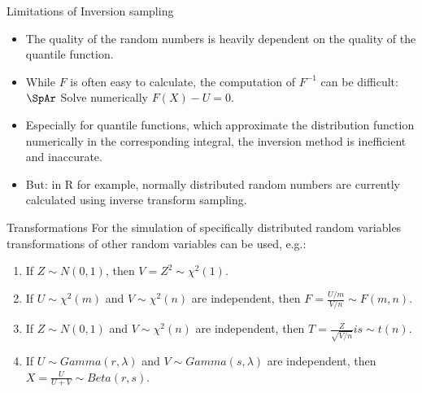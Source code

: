 \begin{vbframe}{Limitations of Inversion sampling}
\begin{itemize}
  \item The quality of the random numbers is heavily dependent on the quality of the quantile function.
  \item While $F$ is often easy to calculate, the computation of $F^{-1}$ can be difficult:
\\ $\SpAr$ Solve numerically $F(X) - U = 0$.
  \item Especially for quantile functions, which approximate the distribution function numerically in the corresponding integral, the inversion method is inefficient and inaccurate.
 \item But: in R for example, normally distributed random numbers are currently calculated using inverse transform sampling.
\end{itemize}
\end{vbframe}

\begin{vbframe}{Transformations} %
For the simulation of specifically distributed random variables transformations of other random variables can be used, e.g.:
\lz
\begin{enumerate}
\item If $Z \sim N(0,1)$, then $V=Z^2 \sim \chi^2(1)$.
\item If $U \sim \chi^2(m)$ and $V \sim \chi^2(n)$ are independent, then $F=\frac{U/m}{V/n} \sim F(m,n)$.
\item If $Z \sim N(0,1)$ and $V \sim \chi^2(n)$ are independent, then $T=\frac{Z}{\sqrt{V/n}} is \sim t(n)$.
\item If $U \sim Gamma(r, \lambda)$ and $V \sim Gamma(s, \lambda)$ are independent, then $X=\frac{U}{U+V} \sim Beta(r,s)$.
\end{enumerate}
\end{vbframe}




